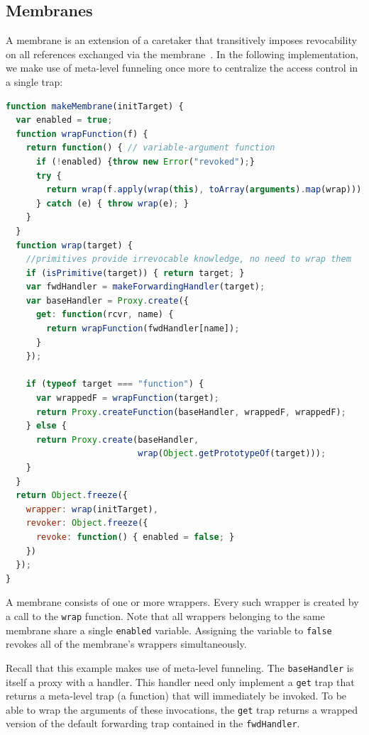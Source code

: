 \documentclass{sig-alternate}
\begin{document}
\subsection{Membranes}
\label{sub:membranes}

A membrane is an extension of a caretaker that transitively imposes revocability on all references exchanged via the membrane~\cite{miller06robust}. In the following implementation, we make use of meta-level funneling once more to centralize the access control in a single trap:

\begin{lstlisting}[language=javascript]
function makeMembrane(initTarget) {
  var enabled = true;
  function wrapFunction(f) {
    return function() { // variable-argument function
      if (!enabled) {throw new Error("revoked");}
      try {
        return wrap(f.apply(wrap(this), toArray(arguments).map(wrap)));
      } catch (e) { throw wrap(e); } 
    }
  }
  function wrap(target) {
    //primitives provide irrevocable knowledge, no need to wrap them
    if (isPrimitive(target)) { return target; }
    var fwdHandler = makeForwardingHandler(target);
    var baseHandler = Proxy.create({
      get: function(rcvr, name) {
        return wrapFunction(fwdHandler[name]);
      }
    });
    
    if (typeof target === "function") {
      var wrappedF = wrapFunction(target);
      return Proxy.createFunction(baseHandler, wrappedF, wrappedF);
    } else {
      return Proxy.create(baseHandler,
                          wrap(Object.getPrototypeOf(target)));
    }
  }
  return Object.freeze({
    wrapper: wrap(initTarget),
    revoker: Object.freeze({
      revoke: function() { enabled = false; }
    })
  });
}
\end{lstlisting}

A membrane consists of one or more wrappers. Every such wrapper is created by a call to the \texttt{wrap} function. Note that all wrappers belonging to the same membrane share a single \texttt{enabled} variable. Assigning the variable to \texttt{false} revokes all of the membrane's wrappers simultaneously.

Recall that this example makes use of meta-level funneling. The \texttt{baseHandler} is itself a proxy with a handler. This handler need only implement a \texttt{get} trap that returns a meta-level trap (a function) that will immediately be invoked. To be able to wrap the arguments of these invocations, the \texttt{get} trap returns a wrapped version of the default forwarding trap contained in the \texttt{fwdHandler}.
\end{document}
